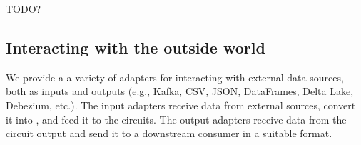 TODO?

\subsection{Interacting with the outside world}

We provide a a variety of adapters for interacting with external data
sources, both as inputs and outputs (e.g., Kafka, CSV, JSON,
DataFrames, Delta Lake, Debezium, etc.).  The input adapters receive
data from external sources, convert it into \zrs, and feed it to the
circuits.  The output adapters receive data from the circuit output
and send it to a downstream consumer in a suitable format.


